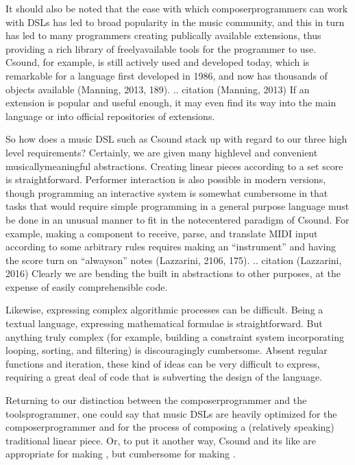 \documentclass[letterpaper,10pt,english]{sphinxmanual}
\begin{document}
\sphinxAtStartPar
It should also be noted that the ease with which composer\sphinxhyphen{}programmers can work
with DSLs has led to broad popularity in the music community, and this
in turn has led to many programmers creating publically available extensions, thus providing
a rich library of freely\sphinxhyphen{}available tools for the programmer to use.
Csound, for example, is still actively used and developed today, which is
remarkable for a language first developed in 1986, and now has thousands of objects available (Manning, 2013, 189).
.. citation (Manning, 2013)
If an extension is popular and useful enough, it may even find its way into the
main language or into official repositories of extensions.

\sphinxAtStartPar
So how does a music DSL such as Csound stack up with regard to our three high level requirements?
Certainly, we are given many high\sphinxhyphen{}level and convenient musically\sphinxhyphen{}meaningful abstractions.
Creating linear pieces according to a set score is straightforward.
Performer interaction is also possible in modern versions, though programming
an interactive system is somewhat cumbersome in that tasks that would require simple programming
in a general purpose language
must be done in an unusual manner to fit in the note\sphinxhyphen{}centered paradigm of Csound.
For example,  making a component to receive, parse, and translate MIDI input according
to some arbitrary rules requires making an “instrument” and having the
score turn on “always\sphinxhyphen{}on” notes (Lazzarini, 2106, 175).
.. citation (Lazzarini, 2016)
Clearly we are bending the built in abstractions to other purposes,
at the expense of easily comprehensible code.

\sphinxAtStartPar
Likewise, expressing complex algorithmic processes can be difficult.
Being a textual language, expressing mathematical formulae is straightforward.
But anything truly complex (for example, building a constraint system incorporating
looping, sorting, and filtering) is discouragingly cumbersome.
Absent regular functions and iteration, these kind of ideas can be very difficult to express,
requiring a great deal of code that is subverting the design of the language.

\sphinxAtStartPar
Returning to our distinction between the composer\sphinxhyphen{}programmer and the tools\sphinxhyphen{}programmer,
one could say that music DSLs are heavily optimized for the composer\sphinxhyphen{}programmer
and for the process of composing a (relatively speaking) traditional linear piece.
Or, to put it another way, Csound and its like are appropriate for making ,
but cumbersome for making .
\end{document}
